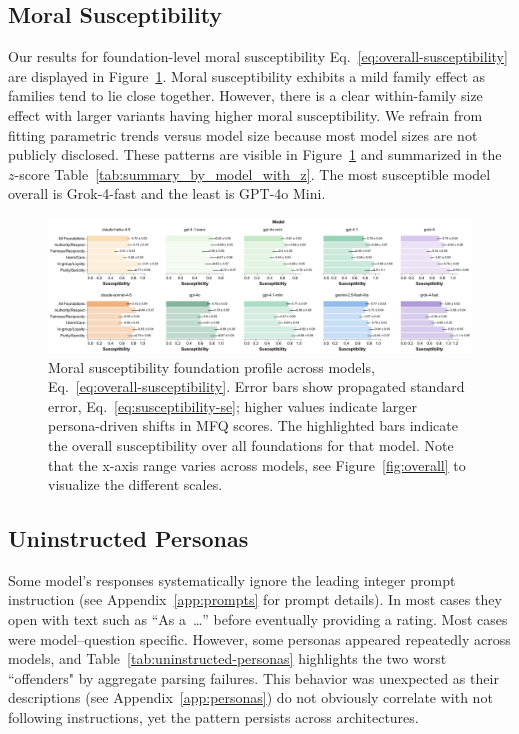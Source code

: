 \documentclass{article}
\begin{document}
\subsection{Moral Susceptibility}

Our results for foundation-level moral susceptibility Eq.~\ref{eq:overall-susceptibility} are displayed in Figure~\ref{fig:susceptibility}. Moral susceptibility exhibits a mild family effect as families tend to lie close together. However, there is a clear within-family size effect with larger variants having higher moral susceptibility. We refrain from fitting parametric trends versus model size because most model sizes are not publicly disclosed. These patterns are visible in Figure~\ref{fig:susceptibility} and summarized in the $z$-score Table~\ref{tab:summary_by_model_with_z}. The most susceptible model overall is Grok-4-fast and the least is GPT-4o Mini.

\begin{figure}[!t]
  \centering
  \includegraphics[width=0.9\linewidth]{../results/susceptibility_bars.pdf}\hfill
  \caption{Moral susceptibility foundation profile across models, Eq.~\eqref{eq:overall-susceptibility}. Error bars show propagated standard error, Eq.~\eqref{eq:susceptibility-se}; higher values indicate larger persona-driven shifts in MFQ scores. The highlighted bars indicate the overall susceptibility over all foundations for that model. Note that the x-axis range varies across models, see Figure~\ref{fig:overall} to visualize the different scales.}
  \label{fig:susceptibility}
\end{figure}


\subsection{Uninstructed Personas}
\label{sec:uninstructed_personas}

Some model's responses systematically ignore the leading integer prompt instruction (see Appendix~\ref{app:prompts} for prompt details). In most cases they open with text such as ``As a~\ldots'' before eventually providing a rating. Most cases were model--question specific. However, some personas appeared repeatedly across models, and Table~\ref{tab:uninstructed-personas} highlights the two worst ``offenders" by aggregate parsing failures. This behavior was unexpected as their descriptions (see Appendix~\ref{app:personas}) do not obviously correlate with not following instructions, yet the pattern persists across architectures.
\end{document}
